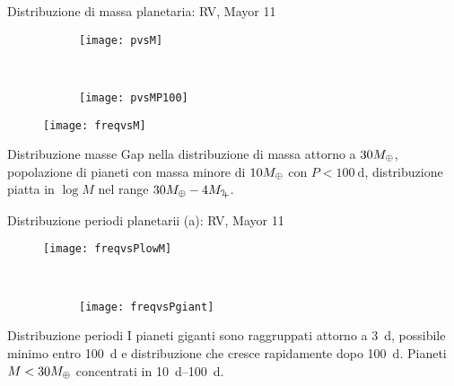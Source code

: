 \begin{frame}{Distribuzione di massa planetaria: RV, Mayor 11}
\begin{figure}[!ht] \begin{subfigure}[b]{0.47\textwidth}
\centering \texttt{[image: pvsM]} \label{fig:pvsM} \end{subfigure}
~
\begin{subfigure}[b]{0.47\textwidth} \centering \texttt{[image: pvsMP100]}\label{fig:pvsMP100}
\end{subfigure}
\end{figure} 

\begin{figure}[!ht]\texttt{[image: freqvsM]}\label{fig:freqvsM}
\end{figure}

\end{frame}

\begin{wordonframe}{Distribuzione masse}
Gap nella distribuzione di massa attorno a $30M_{\oplus}{}$, popolazione di pianeti con massa minore di $10M_{\oplus}{}$ con $P<\SI{100}{\day}$, distribuzione piatta in $\log{M}$ nel range $30\mearth{}-4\mjupiter{}$.
\end{wordonframe}

\begin{frame}{Distribuzione periodi planetarii (a): RV, Mayor 11}

\begin{subfigure}[b]{0.47\textwidth} \centering \texttt{[image: freqvsPlowM]}\label{fig:freqvsPlowM}\end{subfigure}
~
\begin{figure}[!ht]
\begin{subfigure}[b]{0.47\textwidth} \centering \texttt{[image: freqvsPgiant]} \label{fig:freqvsPgiant} \end{subfigure}
\end{figure}
\end{frame}

\begin{wordonframe}{Distribuzione periodi}
I pianeti giganti sono raggruppati attorno a \SI{3}{\day}, possibile minimo entro \SI{100}{\day} e distribuzione che cresce rapidamente dopo \SI{100}{\day}.
Pianeti $M<30M_{\oplus}{}$ concentrati in \SIrange{10}{100}{\day}.
\end{wordonframe}

